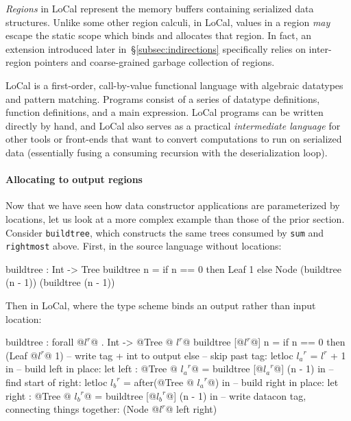 \documentclass[showabstract,showacknowledgments,showpreface,showdedication,school]{iuphd}
\makeatletter
\theoremstyle{nonumberplain}
\newcommand{\sysname}[0]{LoCal\xspace}
\newcommand{\ourcalc}[0]{\sysname}
\newcommand{\skeywd}[1]{\mathit{#1}}
\newcommand{\reg}{\skeywd{r}}
\newcommand{\locreg}[2]{\ensuremath{{#1}^{#2}}}
\newcommand{\tyatlocreg}[3]{#1 \ensuremath{@} \locreg{#2}{#3}}
\newcommand{\secref}[1]{\S\ref{#1}}
\makeatother
\begin{document}
{\emph{Regions} in \ourcalc{} represent the memory buffers containing serialized data
  structures.  Unlike some other region calculi, in \ourcalc{}, values in a
  region \emph{may} escape the static scope which binds and allocates that region. In
  fact, an extension introduced later in~\secref{subsec:indirections}
  specifically relies on inter-region pointers and coarse-grained garbage
  collection of regions.}


\ourcalc{} is a first-order,
call-by-value functional language with algebraic datatypes and pattern
matching. Programs consist of a series of datatype definitions, function
definitions, and a main expression.
\ourcalc{} programs can be written directly by hand, and \ourcalc{} also serves
as a practical {\em intermediate language} for other tools or front-ends that
want to convert computations to run on serialized data (essentially fusing a
consuming recursion with the deserialization loop).

\paragraph{Allocating to output regions}

Now that we have seen how data constructor applications are parameterized by
locations, let us look at a more complex example than those of the prior section.
Consider \lstinline[mathescape]{buildtree}, which constructs the same trees consumed by \lstinline[mathescape]{sum}
and \lstinline[mathescape]{rightmost} above.  First, in the source language without locations:

\begin{code}
buildtree : Int -> Tree
buildtree n = if n == 0
              then Leaf 1
              else Node (buildtree (n - 1))
                        (buildtree (n - 1))
\end{code}
Then in {\ourcalc}, where the type scheme binds an output rather than input location:
\begin{code}
buildtree : forall @\locreg{l}{r}@ . Int -> @\tyatlocreg{Tree}{l}{r}@
buildtree [@\locreg{l}{r}@] n =
  if n == 0 then (Leaf @\locreg{l}{r}@ 1) -- write tag + int to output
  else -- skip past tag:
       letloc $\locreg{l_a}{r}$ = $\locreg{l}{r}$ + 1 in
       -- build left in place:
       let left : @\tyatlocreg{Tree}{l_a}{\reg}@ =
           buildtree [@\locreg{l_a}{r}@] (n - 1) in
       -- find start of right:
       letloc $\locreg{l_b}{r}$ = after(@\tyatlocreg{Tree}{l_a}{\reg}@) in
       -- build right in place:
       let right : @\tyatlocreg{Tree}{l_b}{\reg}@ =
           buildtree [@\locreg{l_b}{r}@] (n - 1) in
       -- write datacon tag, connecting things together:
       (Node @\locreg{l}{r}@ left right)
  \end{code}
\end{document}
